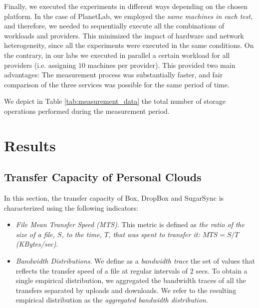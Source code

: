 Finally, we executed the experiments
in different ways depending on the chosen platform. In the case of
PlanetLab, we employed the \textit{same machines in each test}, and therefore, 
we needed to sequentially execute all the combinations of workloads and providers. 
This minimized the impact of hardware and network
heterogeneity, since all the experiments were executed in the same conditions.
On the contrary, in our labs we executed in parallel a certain workload
for all providers (i.e. assigning $10$ machines per provider).
This provided two main advantages: The measurement process was
substantially faster, and fair comparison of the three services
was possible for the same period of time. 
 
We depict in Table \ref{tab:measurement_data} the total 
number of storage operations performed during the measurement period.

\section{Results}

\subsection{Transfer Capacity of Personal Clouds}
In this section, the transfer capacity of Box, DropBox and SugarSync is characterized using the following indicators:
\begin{itemize}
	\item \textit{File Mean Transfer Speed (MTS)}. This metric is defined as \textit{the ratio of
	the size of a file, $S$, to the time, $T$, that was spent to transfer it: $MTS = {S}/{T}$ (KBytes/sec)}. 
	\item \textit{Bandwidth Distributions}. We define as a \textit{bandwidth trace} the set of
	values that reflects the transfer speed of a file at regular intervals of $2$ secs. To
	obtain a single empirical distribution, we aggregated the bandwidth traces of
	all the transfers separated by uploads and downloads. We refer to the resulting empirical
	distribution as the \textit{aggregated bandwidth distribution}.
	 
\end{itemize}

